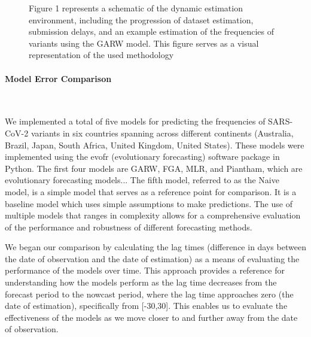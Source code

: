 \documentclass[11pt,oneside,letterpaper]{article}
\begin{document}
\begin{figure}[H]
{    %
	Figure 1 represents a schematic of the dynamic estimation environment, including the progression of dataset estimation, submission delays, and an example estimation of the frequencies of variants using the GARW model. 
    This figure serves as a visual representation of the used methodology
	}
	\label{Figure1Final}
\end{figure}





\paragraph{Model Error Comparison}\


We implemented a total of five models for predicting the frequencies of SARS-CoV-2 variants in six countries spanning across different continents (Australia, Brazil, Japan, South Africa, United Kingdom, United States).
These models were implemented using the evofr (evolutionary forecasting) software package in Python. %
The first four models are GARW, FGA, MLR, and Piantham, which are evolutionary forecasting models... %
The fifth model, referred to as the Naive model, is a simple model that serves as a reference point for comparison. 
It is a baseline model which uses simple assumptions to make predictions. %
The use of multiple models that ranges in complexity allows for a comprehensive evaluation of the performance and robustness of different forecasting methods. %


We began our comparison by calculating the lag times (difference in days between the date of observation and the date of estimation) as a means of evaluating the performance of the models over time.
This approach provides a reference for understanding how the models perform as the lag time decreases from the forecast period to the nowcast period, where the lag time approaches zero (the date of estimation), specifically from [-30,30].
This enables us to evaluate the effectiveness of the models as we move closer to and further away from the date of observation. 
\end{document}
